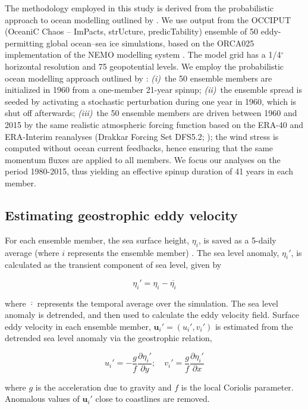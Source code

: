 \documentclass{agujournal2019}
\begin{document}
The methodology employed in this study is derived from the probabilistic approach to ocean modelling outlined by \citet{Bessieres2017}.
We use output from the OCCIPUT (OceaniC Chaos – ImPacts, strUcture, predicTability) ensemble of 50 eddy-permitting global ocean--sea ice simulations, based on the ORCA025 implementation \citep[e.g.][]{Barnier2006} of the NEMO modelling system \citep{Madec2012}. 
The model grid has a 1/4$^\circ$ horizontal resolution and 75 geopotential levels. We employ the probabilistic ocean modelling approach outlined by \citet{Bessieres2017}: \emph{(i)}~the 50 ensemble members are initialized in 1960 from a one-member 21-year spinup; \emph{(ii)}~the ensemble spread is seeded by activating a stochastic perturbation \citep{Brankart-etal-2015} during one year in 1960, which is shut off afterwards; \emph{(iii)}~the 50 ensemble members are driven between 1960 and 2015 by the same realistic atmospheric forcing function based on the ERA-40 and ERA-Interim reanalyses (Drakkar Forcing Set DFS5.2; \citet{Dussin-etal-2016}); the wind stress is computed without ocean current feedbacks, hence ensuring that the same momentum fluxes are applied to all members. 
We focus our analyses on the period 1980-2015, thus yielding an effective spinup duration of 41 years in each member. 


\subsection{Estimating geostrophic eddy velocity}
For each ensemble member, the sea surface height, $\eta_i$, is saved as a 5-daily average (where $i$ represents the ensemble member) . 
The sea level anomaly, $\eta_i'$, is calculated as the transient component of sea level, given by 
\begin{linenomath*}
\begin{equation}
\eta_i' = \eta_i - \overline{\eta_i}
\end{equation}
\end{linenomath*}
where $\overline{\cdot}$ represents the temporal average over the simulation.
The sea level anomaly is detrended, and then used to calculate the eddy velocity field.
Surface eddy velocity in each ensemble member, $\mathbf{u}_i' = (u_i', v_i')$ is estimated from the detrended sea level anomaly via the geostrophic relation,
\begin{linenomath*}
\begin{equation}
u_i' = - \frac{g}{f} \frac{\partial \eta_i'}{\partial y}; \quad v_i' = \frac{g}{f} \frac{\partial \eta_i'}{\partial x}
\end{equation}
\end{linenomath*}
where $g$ is the acceleration due to gravity and $f$ is the local Coriolis parameter.
Anomalous values of $\mathbf{u}_i'$ close to coastlines are removed.
\end{document}
